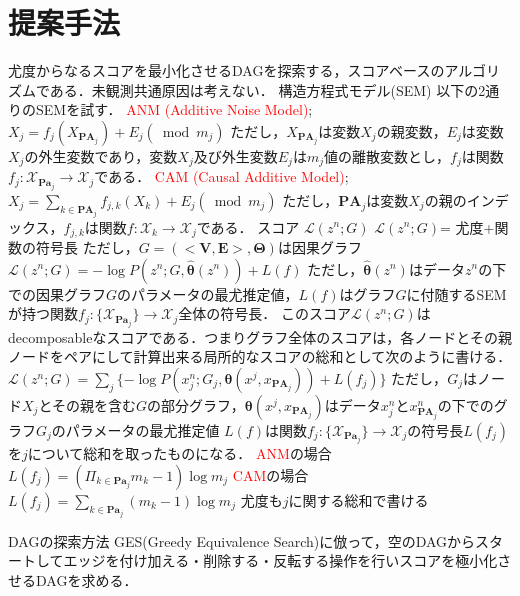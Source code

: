 \documentclass[dvipdfmx]{jsarticle}
\newcommand{\red}[1]{\textcolor{red}{#1}}
\begin{document}
\section{提案手法}


\begin{outline}
尤度からなるスコアを最小化させるDAGを探索する，スコアベースのアルゴリズムである．未観測共通原因は考えない．
\1 構造方程式モデル(SEM)
    \2 以下の2通りのSEMを試す．
    \2 \red{ANM (Additive Noise Model)}; $X_j = f_j(X_{\textbf{PA}_j}) + E_j (\bmod m_j)$
        \3 ただし，$X_{\textbf{PA}_j}$は変数$X_j$の親変数，$E_j$は変数$X_j$の外生変数であり，変数$X_j$及び外生変数$E_j$は$m_j$値の離散変数とし，$f_j$は関数$f_j: \mathcal{X}_{\textbf{Pa}_{j}} \to \mathcal{X}_j$である．
    \2 \red{CAM (Causal Additive Model)}; $X_j = \sum_{k \in \textbf{PA}_j}f_{j, k}(X_k) + E_j (\bmod m_j)$
        \3 ただし，$ \textbf{PA}_j$は変数$X_j$の親のインデックス，$f_{j, k}$は関数$f: \mathcal{X}_k \to \mathcal{X}_j$である．
\1 スコア $\mathcal{L}(z^n; G)$
    \2 $\mathcal{L}(z^n; G)$= 尤度+関数の符号長
        \3 ただし，$G =  (<\mathbf{V, E}>, \mathcal{\mathbf{\Theta}})$は因果グラフ
    \2 $\mathcal{L}(z^n; G) = - \log P(z^n; G, \hat{\bm{\theta}}(z^n)) + L(f)$
        \3 ただし，$ \hat{\bm{\theta}}(z^n)$はデータ$z^n$の下での因果グラフ$G$のパラメータの最尤推定値，$L(f)$はグラフ$G$に付随するSEMが持つ関数$f_j: \{\mathcal{X}_{\textbf{Pa}_{j}}\} \to \mathcal{X}_j$全体の符号長．
    \2 このスコア$\mathcal{L}(z^n; G)$はdecomposableなスコアである．つまりグラフ全体のスコアは，各ノードとその親ノードをペアにして計算出来る局所的なスコアの総和として次のように書ける．
        \3 $\mathcal{L}(z^n; G) = \sum_{j} \{- \log P(x_j^n; G_{j}, \bm{\theta}(x^j, x_{\textbf{PA}_j})) + L(f_j)\}$ 
            \4 ただし，$G_j$はノード$X_j$とその親を含む$G$の部分グラフ，$\bm{\theta}(x^j, x_{\textbf{PA}_j})$はデータ$x_j^n$と$x_{\textbf{PA}_j}^n$の下でのグラフ$G_j$のパラメータの最尤推定値
        \3 $L(f)$は関数$f_j: \{\mathcal{X}_{\textbf{Pa}_{j}}\} \to \mathcal{X}_j$の符号長$L(f_j)$を$j$について総和を取ったものになる．
            \4 \red{ANM}の場合$L(f_j) = (\Pi_{k \in \textbf{Pa}_{j}} m_k -1 ) \log m_j$
            \4 \red{CAM}の場合$L(f_j) = \sum_{k \in \textbf{Pa}_{j}}( m_k -1 ) \log m_j$
        \3 尤度も$j$に関する総和で書ける
        

\1 DAGの探索方法
    \2 GES(Greedy Equivalence Search)\cite{hauser2012characterization}に倣って，空のDAGからスタートしてエッジを付け加える・削除する・反転する操作を行いスコアを極小化させるDAGを求める．
\end{outline}
\end{document}
